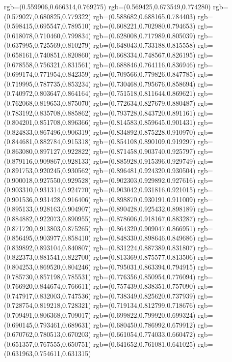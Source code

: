{{{			rgb=(0.559906,0.666314,0.769275)
			rgb=(0.569425,0.673549,0.774280)
			rgb=(0.579027,0.680825,0.779322)
			rgb=(0.588682,0.688165,0.784403)
			rgb=(0.598415,0.695547,0.789510)
			rgb=(0.608221,0.702980,0.794653)
			rgb=(0.618078,0.710460,0.799834)
			rgb=(0.628008,0.717989,0.805039)
			rgb=(0.637995,0.725569,0.810279)
			rgb=(0.648043,0.733188,0.815558)
			rgb=(0.658161,0.740851,0.820860)
			rgb=(0.668334,0.748567,0.826195)
			rgb=(0.678558,0.756321,0.831561)
			rgb=(0.688846,0.764116,0.836946)
			rgb=(0.699174,0.771954,0.842359)
			rgb=(0.709566,0.779826,0.847785)
			rgb=(0.719995,0.787735,0.853234)
			rgb=(0.730468,0.795676,0.858694)
			rgb=(0.740972,0.803647,0.864164)
			rgb=(0.751518,0.811644,0.869621)
			rgb=(0.762068,0.819653,0.875070)
			rgb=(0.772634,0.827679,0.880487)
			rgb=(0.783192,0.835708,0.885862)
			rgb=(0.793728,0.843720,0.891161)
			rgb=(0.804201,0.851708,0.896366)
			rgb=(0.814583,0.859645,0.901431)
			rgb=(0.824833,0.867496,0.906319)
			rgb=(0.834892,0.875228,0.910970)
			rgb=(0.844681,0.882784,0.915318)
			rgb=(0.854108,0.890109,0.919297)
			rgb=(0.863080,0.897127,0.922822)
			rgb=(0.871458,0.903740,0.925797)
			rgb=(0.879116,0.909867,0.928133)
			rgb=(0.885928,0.915396,0.929749)
			rgb=(0.891753,0.920245,0.930562)
			rgb=(0.896481,0.924320,0.930504)
			rgb=(0.900018,0.927550,0.929528)
			rgb=(0.902303,0.929892,0.927616)
			rgb=(0.903310,0.931314,0.924770)
			rgb=(0.903042,0.931816,0.921015)
			rgb=(0.901536,0.931428,0.916406)
			rgb=(0.898870,0.930191,0.911009)
			rgb=(0.895133,0.928163,0.904907)
			rgb=(0.890428,0.925432,0.898189)
			rgb=(0.884882,0.922073,0.890955)
			rgb=(0.878606,0.918167,0.883287)
			rgb=(0.871720,0.913803,0.875265)
			rgb=(0.864320,0.909047,0.866951)
			rgb=(0.856495,0.903977,0.858410)
			rgb=(0.848330,0.898646,0.849686)
			rgb=(0.839892,0.893104,0.840807)
			rgb=(0.831224,0.887389,0.831807)
			rgb=(0.822373,0.881541,0.822700)
			rgb=(0.813369,0.875577,0.813506)
			rgb=(0.804253,0.869520,0.804246)
			rgb=(0.795031,0.863394,0.794915)
			rgb=(0.785730,0.857198,0.785531)
			rgb=(0.776356,0.850954,0.776094)
			rgb=(0.766920,0.844674,0.766611)
			rgb=(0.757439,0.838351,0.757090)
			rgb=(0.747917,0.832003,0.747536)
			rgb=(0.738349,0.825620,0.737939)
			rgb=(0.728754,0.819218,0.728321)
			rgb=(0.719134,0.812799,0.718676)
			rgb=(0.709491,0.806368,0.709017)
			rgb=(0.699822,0.799920,0.699324)
			rgb=(0.690145,0.793461,0.689631)
			rgb=(0.680450,0.786992,0.679912)
			rgb=(0.670762,0.780513,0.670203)
			rgb=(0.661054,0.774033,0.660472)
			rgb=(0.651357,0.767555,0.650751)
			rgb=(0.641652,0.761081,0.641025)
			rgb=(0.631963,0.754611,0.631315)
}}}
